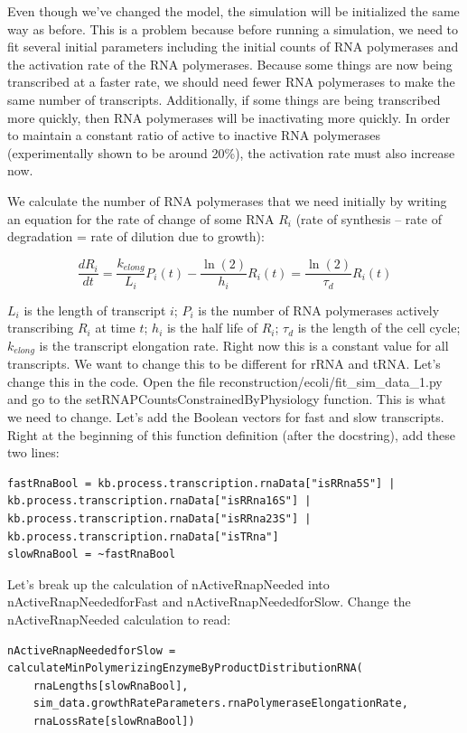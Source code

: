 \documentclass[12pt]{article}
\begin{document}
Even though we've changed the model, the simulation will be initialized the same way as before. This is a problem because before running a simulation, we need to fit several initial parameters including the initial counts of RNA polymerases and the activation rate of the RNA polymerases. Because some things are now being transcribed at a faster rate, we should need fewer RNA polymerases to make the same number of transcripts. Additionally, if some things are being transcribed more quickly, then RNA polymerases will be inactivating more quickly. In order to maintain a constant ratio of active to inactive RNA polymerases (experimentally shown to be around 20\%), the activation rate must also increase now. 

\par

We calculate the number of RNA polymerases that we need initially by writing an equation for the rate of change of some RNA $R_i$ (rate of synthesis – rate of degradation = rate of dilution due to growth):

$$
\frac{d R_i}{dt} = \frac{k_{elong}}{L_i}P_i(t) - \frac{\ln(2)}{h_i}R_i(t) = \frac{\ln(2)}{\tau_d}R_i(t)
$$


$L_i$ is the length of transcript $i$; $P_i$ is the number of RNA polymerases actively transcribing $R_i$ at time $t$; $h_i$ is the half life of $R_i$; $\tau_d$ is the length of the cell cycle; $k_{elong}$ is the transcript elongation rate. Right now this is a constant value for all transcripts. We want to change this to be different for rRNA and tRNA. Let’s change this in the code. Open the file reconstruction/ecoli/fit_sim_data_1.py and go to the setRNAPCountsConstrainedByPhysiology function. This is what we need to change. Let’s add the Boolean vectors for fast and slow transcripts. Right at the beginning of this function definition (after the docstring), add these two lines:

\lstset{language=Python}
\begin{lstlisting}
fastRnaBool = kb.process.transcription.rnaData["isRRna5S"] | kb.process.transcription.rnaData["isRRna16S"] | kb.process.transcription.rnaData["isRRna23S"] | kb.process.transcription.rnaData["isTRna"]
slowRnaBool = ~fastRnaBool
\end{lstlisting}

Let’s break up the calculation of nActiveRnapNeeded into nActiveRnapNeededforFast and nActiveRnapNeededforSlow. Change the nActiveRnapNeeded calculation to read:

\begin{lstlisting}
nActiveRnapNeededforSlow = calculateMinPolymerizingEnzymeByProductDistributionRNA(
    rnaLengths[slowRnaBool], 
    sim_data.growthRateParameters.rnaPolymeraseElongationRate, 
    rnaLossRate[slowRnaBool])
\end{lstlisting}
\end{document}
